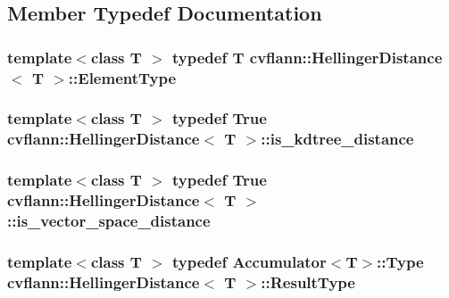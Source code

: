 \subsection{Member Typedef Documentation}
\hypertarget{structcvflann_1_1HellingerDistance_a3b4b98376064e5051537fb2ec044f18c}{
\subsubsection[{Element\-Type}]{\setlength{\rightskip}{0pt plus 5cm}template$<$class T $>$ typedef {\bf T} {\bf cvflann\-::\-Hellinger\-Distance}$<$ {\bf T} $>$\-::{\bf Element\-Type}}}\label{structcvflann_1_1HellingerDistance_a3b4b98376064e5051537fb2ec044f18c}
\hypertarget{structcvflann_1_1HellingerDistance_aeae75a5a68fe211e7ee909f3a90e93d3}{
\subsubsection[{is\-\_\-kdtree\-\_\-distance}]{\setlength{\rightskip}{0pt plus 5cm}template$<$class T $>$ typedef {\bf True} {\bf cvflann\-::\-Hellinger\-Distance}$<$ {\bf T} $>$\-::{\bf is\-\_\-kdtree\-\_\-distance}}}\label{structcvflann_1_1HellingerDistance_aeae75a5a68fe211e7ee909f3a90e93d3}
\hypertarget{structcvflann_1_1HellingerDistance_ab5f54b4b04397ad6a581c55576bf16af}{
\subsubsection[{is\-\_\-vector\-\_\-space\-\_\-distance}]{\setlength{\rightskip}{0pt plus 5cm}template$<$class T $>$ typedef {\bf True} {\bf cvflann\-::\-Hellinger\-Distance}$<$ {\bf T} $>$\-::{\bf is\-\_\-vector\-\_\-space\-\_\-distance}}}\label{structcvflann_1_1HellingerDistance_ab5f54b4b04397ad6a581c55576bf16af}
\hypertarget{structcvflann_1_1HellingerDistance_a5ea5bc129fed2c06da92c75586ef5833}{
\subsubsection[{Result\-Type}]{\setlength{\rightskip}{0pt plus 5cm}template$<$class T $>$ typedef {\bf Accumulator}$<${\bf T}$>$\-::Type {\bf cvflann\-::\-Hellinger\-Distance}$<$ {\bf T} $>$\-::{\bf Result\-Type}}}\label{structcvflann_1_1HellingerDistance_a5ea5bc129fed2c06da92c75586ef5833}


